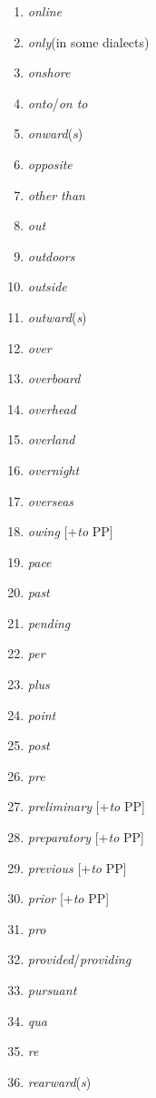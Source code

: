 \begin{multicols}{3}
\begin{enumerate}[noitemsep]
    \item \textit{online}
    \item \textit{only}\newline(in some dialects)
    \item \textit{onshore}
    \item \textit{onto}/\textit{on to}
    \item \textit{onward}(\textit{s})
    \item \textit{opposite}
    \item \textit{other than}
    \item \textit{out}
    \item \textit{outdoors}
    \item \textit{outside}
    \item \textit{outward}(\textit{s})
    \item \textit{over}
    \item \textit{overboard}
    \item \textit{overhead}
    \item \textit{overland}
    \item \textit{overnight}
    \item \textit{overseas}
    \item \textit{owing} [+\textit{to} PP]
    \item \textit{pace}
    \item \textit{past}
    \item \textit{pending}
    \item \textit{per}
    \item \textit{plus}
    \item \textit{point}
    \item \textit{post}
    \item \textit{pre}
    \item \textit{preliminary} [+\textit{to} PP]
    \item \textit{preparatory} [+\textit{to} PP]
    \item \textit{previous} [+\textit{to} PP]
    \item \textit{prior} [+\textit{to} PP]
    \item \textit{pro}
    \item \textit{provided}/\textit{providing}
    \item \textit{pursuant}
    \item \textit{qua}
    \item \textit{re}
    \item \textit{rearward}(\textit{s})

\end{enumerate}
\end{multicols}
